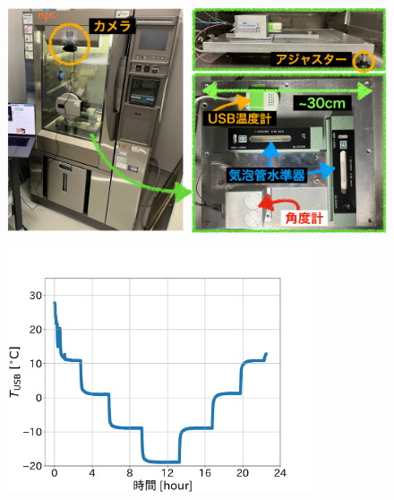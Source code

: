 \documentclass[../../main.tex]{subfiles}
\begin{document}
\begin{figure}
    \centering
    \includegraphics[width=1.0\textwidth]{tiltsensor/evaluation_system.pdf}
    \label{fig:evaluation_system}
\end{figure}
\begin{figure}[H]
    \centering
    \includegraphics[width=0.8\textwidth]{tiltsensor/bath_temp_usb.pdf}
    \label{fig:bath_temp_usb}
\end{figure}
\end{document}
